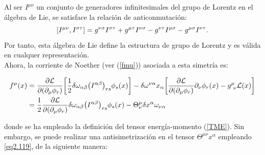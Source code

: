 Al ser $I^{\mu \nu}$ un conjunto de generadores infinitesimales del grupo de Lorentz en el álgebra de Lie, se satisface la relación de anticonmutación:
\begin{equation*}
    \comm{I^{\mu \nu}}{I^{\sigma \tau}}=g^{\nu \sigma}I^{\sigma \tau}+g^{\mu \tau}I^{\nu \sigma} - g^{\nu \tau}I^{\mu \sigma}-g^{\mu \sigma}I^{\nu \tau}.
\end{equation*}
Por tanto, esta álgebra de Lie define la estructura de grupo de Lorentz y es válida en cualquer representación.\\

Ahora, la corriente de Noether (ver (\ref{fmu})) asociada a esta simetría es:

\begin{equation}
    \begin{split}
    f^{\mu}(x) &= \pdv{\mathcal{L}}{(\partial_{\mu}\phi_{r})} \qty[\frac{1}{2} \delta \omega_{\alpha \beta} \qty(I^{\alpha \beta})_{rs}\phi_{s}(x)]-\delta \omega^{\nu \alpha}x_{\alpha} \qty[\pdv{\mathcal{L}}{(\partial_{\mu}\phi_{r})}\partial_{\nu}\phi_{r}(x)-g^{\mu}_{~\nu}\mathcal{L}(x)]\\
    &= \frac{1}{2} \pdv{\mathcal{L}}{(\partial_{\mu}\phi_{r})}\delta \omega_{\alpha \beta} \qty(I^{\alpha \beta})_{rs}\phi_{s}(x)-\Theta^{\mu}_{\nu}\delta x^{\alpha} \omega_{\nu \alpha}
    \end{split}
    \label{eq2.122}
\end{equation}

donde se ha empleado la definición del tensor energía-momento (\ref{TME}). Sin embargo, se puede realizar una antisimetrización en el tensor $\Theta^{\mu \nu}x^{\alpha}$ empleando \ref{eq2.119}, de la siguiente manera:

